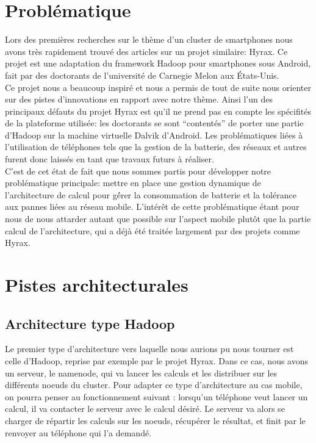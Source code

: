 \documentclass[a4paper,12pt]{article}
\begin{document}
\newpage

\fancyhead[L]{\leftmark}

\section{Problématique}
Lors des premières recherches sur le thème d’un cluster de smartphones nous
avons très rapidement trouvé des articles sur un projet similaire: Hyrax. Ce
projet est une adaptation du framework Hadoop pour smartphones sous Android,
fait par des doctorants de l’université de Carnegie Melon aux États-Unis.\\ Ce
projet nous a beaucoup inspiré et nous a permis de tout de suite nous orienter
sur des pistes d’innovations en rapport avec notre thème. Ainsi l’un des
principaux défauts du projet Hyrax est qu’il ne prend pas en compte les
spécifités de la plateforme utilisée: les doctorants se sont “contentés” de
porter une partie d’Hadoop sur la machine virtuelle Dalvik d’Android. Les
problématiques liées à l’utilisation de téléphones tels que la gestion de la
batterie, des réseaux et autres furent donc laissés en tant que travaux futurs
à réaliser.\\ C’est de cet état de fait que nous sommes partis pour développer
notre problématique principale: mettre en place une gestion dynamique de
l’architecture de calcul pour gé́rer la consommation de batterie et la tolérance
aux pannes liées au réseau mobile. L’intérêt de cette problématique étant pour
nous de nous attarder autant que possible sur l’aspect mobile plutôt que la
partie calcul de l’architecture, qui a déjà été traitée largement par des
projets comme Hyrax.\\

\section{Pistes architecturales}

\subsection{Architecture type Hadoop}
Le premier type d’architecture vers laquelle nous aurions pu nous tourner est
celle d’Hadoop, reprise par exemple par le projet Hyrax. Dans ce cas, nous
avons un serveur, le namenode, qui va lancer les calculs et les distribuer sur
les différents noeuds du cluster.  Pour adapter ce type d’architecture au cas
mobile, on pourra penser au fonctionnement suivant : lorsqu’un téléphone veut
lancer un calcul, il va contacter le serveur avec le calcul désiré. Le serveur
va alors se charger de répartir les calculs sur les noeuds, récupérer le
résultat, et finit par le renvoyer au téléphone qui l’a demandé.
\end{document}
